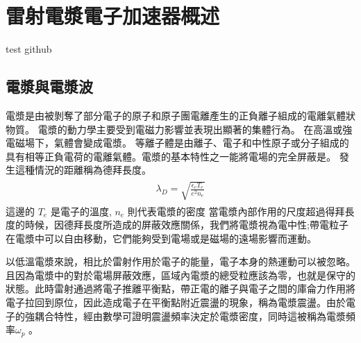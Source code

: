 \chapter{雷射電漿電子加速器概述}

test github

\section{電漿與電漿波}

電漿是由被剝奪了部分電子的原子和原子團電離產生的正負離子組成的電離氣體狀物質。
電漿的動力學主要受到電磁力影響並表現出顯著的集體行為。
在高溫或強電磁場下，氣體會變成電漿。
等離子體是由離子、電子和中性原子或分子組成的具有相等正負電荷的電離氣體。電漿的基本特性之一能將電場的完全屏蔽是。
發生這種情況的距離稱為德拜長度\cite{Buck2011}。
\begin{align}
  \begin{split}
    \lambda_{D} = \sqrt{\frac{\epsilon_e T_e}{e^{2} n_e}}
  \end{split}
\end{align}
 這邊的  \(T_{e}\) 是電子的溫度,  \(n_{e}\) 則代表電漿的密度
當電漿內部作用的尺度超過得拜長度的時候，因德拜長度所造成的屏蔽效應關係，我們將電漿視為電中性;帶電粒子在電漿中可以自由移動，它們能夠受到電場或是磁場的遠場影響而運動。

以低溫電漿來說，相比於雷射作用於電子的能量，電子本身的熱運動可以被忽略。且因為電漿中的對於電場屏蔽效應，區域內電漿的總受粒應該為零，也就是保守的狀態。此時雷射通過將電子推離平衡點，帶正電的離子與電子之間的庫侖力作用將電子拉回到原位，因此造成電子在平衡點附近震盪的現象，稱為電漿震盪。由於電子的強耦合特性，經由數學可證明震盪頻率決定於電漿密度，同時這被稱為電漿頻率\(\omega_{p}\) \cite{Koschitzki:2017qlg}。

